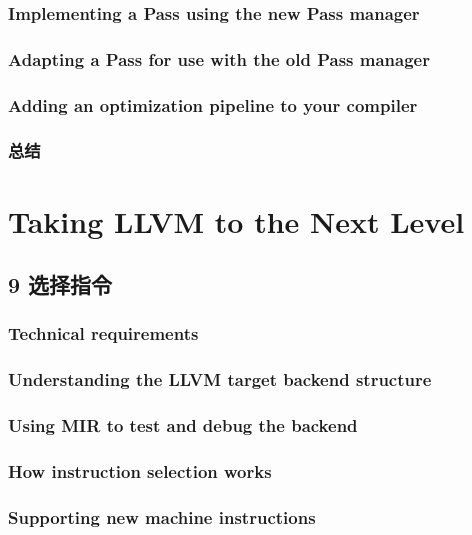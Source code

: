 \documentclass[11pt,a4paper,UTF8]{ctexart}
\begin{document}
		\subsubsection{Implementing a Pass using the new Pass manager}
		\subsubsection{Adapting a Pass for use with the old Pass manager}
		\subsubsection{Adding an optimization pipeline to your compiler}
		\subsubsection{总结}
	
	\section{Taking LLVM to the Next Level}
	\subsection{9 选择指令}
		\subsubsection{Technical requirements}
		\subsubsection{Understanding the LLVM target backend structure}
		\subsubsection{Using MIR to test and debug the backend}
		\subsubsection{How instruction selection works}		
		\subsubsection{Supporting new machine instructions}
\end{document}
